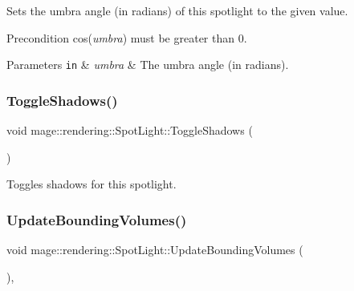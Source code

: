 Sets the umbra angle (in radians) of this spotlight to the given value.

\begin{DoxyPrecond}{Precondition}
cos({\itshape umbra}) must be greater than 0. 
\end{DoxyPrecond}

\begin{DoxyParams}[1]{Parameters}
\mbox{\tt in}  & {\em umbra} & The umbra angle (in radians). \\
\hline
\end{DoxyParams}
\mbox{\label{classmage_1_1rendering_1_1_spot_light_a4e6412e05d894a97409c23d8d088cabf}} 
\subsubsection{\texorpdfstring{Toggle\+Shadows()}{ToggleShadows()}}
{\footnotesize\ttfamily void mage\+::rendering\+::\+Spot\+Light\+::\+Toggle\+Shadows (\begin{DoxyParamCaption}{ }\end{DoxyParamCaption})\hspace{0.3cm}{\ttfamily [noexcept]}}

Toggles shadows for this spotlight. \mbox{\label{classmage_1_1rendering_1_1_spot_light_aa225a105edf22a1a430a1c3aa42bc490}} 
\subsubsection{\texorpdfstring{Update\+Bounding\+Volumes()}{UpdateBoundingVolumes()}}
{\footnotesize\ttfamily void mage\+::rendering\+::\+Spot\+Light\+::\+Update\+Bounding\+Volumes (\begin{DoxyParamCaption}{ }\end{DoxyParamCaption})\hspace{0.3cm}{\ttfamily [private]}, {\ttfamily [noexcept]}}

